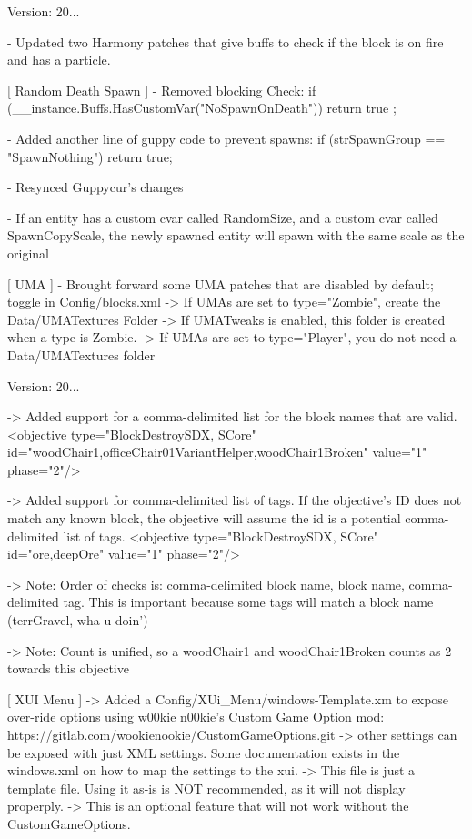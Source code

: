 Version\+: 20... \begin{DoxyVerb}
    - Updated two Harmony patches that give buffs to check if the block is on fire and has a particle.

[ Random Death Spawn ]
    - Removed blocking Check:
        if (__instance.Buffs.HasCustomVar("NoSpawnOnDeath")) return true ;

        - Added another line of guppy code to prevent spawns:
        if (strSpawnGroup == "SpawnNothing") return true;

    - Resynced Guppycur's changes

    - If an entity has a custom cvar called RandomSize, and a custom cvar called SpawnCopyScale, the newly spawned entity will spawn with the same scale as the original

[ UMA ]
    - Brought forward some UMA patches that are disabled by default; toggle in Config/blocks.xml
        -> If UMAs are set to type="Zombie", create the Data/UMATextures Folder
            -> If UMATweaks is enabled, this folder is created when a type is Zombie.
        -> If UMAs are set to type="Player", you do not need a Data/UMATextures folder
\end{DoxyVerb}
 Version\+: 20... \begin{DoxyVerb}[ ObjectiveBlockDestroySDX ]
    -> Added support for a comma-delimited list for the block names that are valid.
        <objective type="BlockDestroySDX, SCore" id="woodChair1,officeChair01VariantHelper,woodChair1Broken" value="1" phase="2"/>

    -> Added support for comma-delimited list of tags. If the objective's ID does not match any known block, the objective will assume the id is a potential comma-delimited list of tags.
        <objective type="BlockDestroySDX, SCore" id="ore,deepOre" value="1" phase="2"/>

    -> Note: Order of checks is: comma-delimited block name, block name, comma-delimited tag. This is important because some tags will match a block name (terrGravel, wha u doin')

    -> Note: Count is unified, so a woodChair1 and woodChair1Broken counts as 2 towards this objective 

[ XUI Menu ]
    -> Added a Config/XUi_Menu/windows-Template.xm to expose over-ride options using w00kie n00kie's Custom Game Option mod: https://gitlab.com/wookienookie/CustomGameOptions.git
        -> other settings can be exposed with just XML settings. Some documentation exists in the windows.xml on how to map the settings to the xui.
        -> This file is just a template file. Using it as-is is NOT recommended, as it will not display properply.
    -> This is an optional feature that will not work without the CustomGameOptions.
\end{DoxyVerb}

